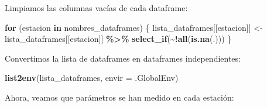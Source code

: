 \documentclass[
]{article}
\newenvironment{Shaded}{\begin{snugshade}}{\end{snugshade}}
\newcommand{\AttributeTok}[1]{\textcolor[rgb]{0.13,0.29,0.53}{#1}}
\newcommand{\ControlFlowTok}[1]{\textcolor[rgb]{0.13,0.29,0.53}{\textbf{#1}}}
\newcommand{\FunctionTok}[1]{\textcolor[rgb]{0.13,0.29,0.53}{\textbf{#1}}}
\newcommand{\NormalTok}[1]{#1}
\newcommand{\OtherTok}[1]{\textcolor[rgb]{0.56,0.35,0.01}{#1}}
\newcommand{\SpecialCharTok}[1]{\textcolor[rgb]{0.81,0.36,0.00}{\textbf{#1}}}
\begin{document}
\begin{Shaded}
\end{Shaded}

Limpiamos las columnas vacías de cada dataframe:

\begin{Shaded}
\begin{Highlighting}[]
\ControlFlowTok{for}\NormalTok{ (estacion }\ControlFlowTok{in}\NormalTok{ nombres\_dataframes) \{}
\NormalTok{  lista\_dataframes[[estacion]] }\OtherTok{\textless{}{-}}\NormalTok{ lista\_dataframes[[estacion]] }\SpecialCharTok{\%\textgreater{}\%}
    \FunctionTok{select\_if}\NormalTok{(}\SpecialCharTok{\textasciitilde{}!}\FunctionTok{all}\NormalTok{(}\FunctionTok{is.na}\NormalTok{(.)))}
\NormalTok{\}}
\end{Highlighting}
\end{Shaded}

Convertimos la lista de dataframes en dataframes independientes:

\begin{Shaded}
\begin{Highlighting}[]
\FunctionTok{list2env}\NormalTok{(lista\_dataframes, }\AttributeTok{envir =}\NormalTok{ .GlobalEnv)}
\end{Highlighting}
\end{Shaded}

Ahora, veamos que parámetros se han medido en cada estación:
\end{document}
